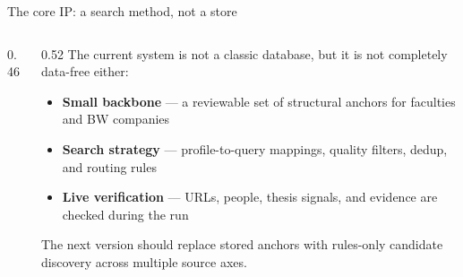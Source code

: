 \documentclass[11pt,aspectratio=169]{beamer}
\begin{document}
\begin{frame}{The core IP: a search method, not a store}
  \begin{columns}[T]
    \begin{column}{0.46\textwidth}
      \begin{center}
      \end{center}
    \end{column}
    \begin{column}{0.52\textwidth}
      \footnotesize
      The current system is not a classic database, but it is not completely
      data-free either:
      \begin{itemize}
        \item \textbf{Small backbone} --- a reviewable set of structural anchors
          for faculties and BW companies
        \item \textbf{Search strategy} --- profile-to-query mappings, quality
          filters, dedup, and routing rules
        \item \textbf{Live verification} --- URLs, people, thesis signals, and
          evidence are checked during the run
      \end{itemize}
      The next version should replace stored anchors with \alert{rules-only
      candidate discovery} across multiple source axes.
    \end{column}
  \end{columns}
\end{frame}
\end{document}
